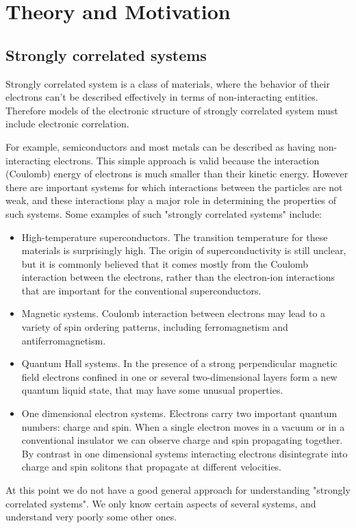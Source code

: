 \section{Theory and Motivation}
\subsection{Strongly correlated systems}
Strongly correlated system is a class of materials, where the behavior of their electrons can't be 
described effectively in terms of non-interacting entities. Therefore models of the electronic
structure of strongly correlated system must include electronic correlation.

For example, semiconductors and most metals can be described as having non-interacting electrons.
This simple approach is valid because the interaction (Coulomb) energy of electrons is much smaller than their kinetic energy.
However there are important systems for which interactions between the particles are not weak,
 and these interactions play a major role in determining the properties of such systems.
Some examples of such "strongly correlated systems" include:
\begin{itemize}
\item
High-temperature superconductors. The transition temperature for these materials is surprisingly high.
The origin of superconductivity is still unclear, but it is commonly believed that it comes mostly from the Coulomb interaction between the electrons,
 rather than the electron-ion interactions that are important for the conventional superconductors.
\item
Magnetic systems. Coulomb interaction between electrons may lead to a variety of spin ordering patterns, including ferromagnetism and antiferromagnetism.
\item
Quantum Hall systems. In the presence of a strong perpendicular magnetic field electrons confined in one or several two-dimensional layers form a new quantum liquid state,
 that may have some unusual properties.
\item
One dimensional electron systems. Electrons carry two important quantum numbers: charge and spin.
When a single electron moves in a vacuum or in a conventional insulator we can observe charge and spin propagating together.
By contrast in one dimensional systems interacting electrons disintegrate into charge and spin solitons that propagate at different velocities.
\end{itemize}
At this point we do not have a good general approach for understanding "strongly correlated systems".
We only know certain aspects of several systems, and understand very poorly some other ones.

